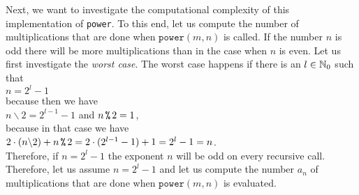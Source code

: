 Next, we want to investigate the computational complexity of this implementation of \texttt{power}.
To this end, let us compute the number of multiplications that are done when
$\mathtt{power}(m,n)$ is called.  If the number $n$ is odd there will be more multiplications than
in the case when $n$ is even.  Let us first investigate the \emph{worst case}.  
The worst case happens if there is an $l\in {\mathbb N}_0$ such that 
\\[0.2cm]
\hspace*{1.3cm}
$n = 2^l - 1$ 
\\[0.2cm]
because then we have 
\\[0.2cm]
\hspace*{1.3cm} $n \backslash 2 = 2^{l-1} - 1$ \quad and \quad $n \,\texttt{\symbol{37}}\, 2 = 1$, \\[0.2cm]
because in that case we have 
\\[0.2cm]
\hspace*{1.3cm}
$2 \cdot(n \backslash 2) + n \,\texttt{\symbol{37}}\, 2 = 2 \cdot (2^{l-1} - 1) + 1 = 2^l - 1 = n$.
\\[0.2cm]
Therefore, if $n = 2^l - 1$ the exponent $n$ will be odd on every recursive call.
Therefore, let us assume $n = 2^l - 1$ and let us compute the number $a_n$ of multiplications that
are done when $\mathtt{power}(m,n)$ is evaluated. 

